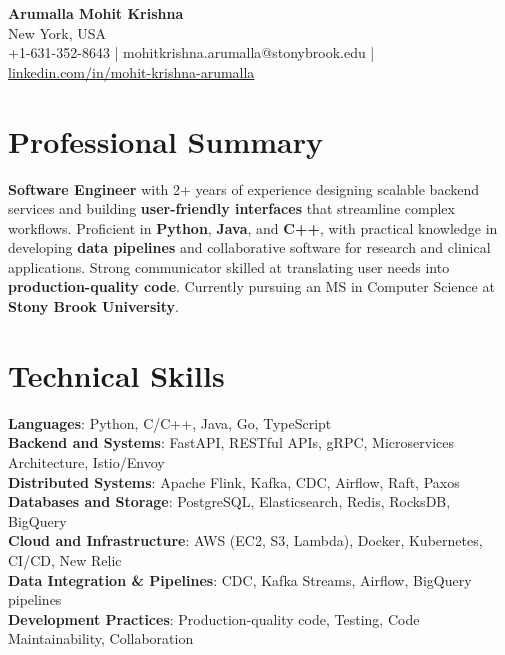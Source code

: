 \documentclass[letterpaper,11pt]{article}
\begin{document}
\begin{center}
  {\Large \textbf{Arumalla Mohit Krishna}} \\
  New York, USA \\
  +1-631-352-8643 \enspace | \enspace mohitkrishna.arumalla@stonybrook.edu \enspace | \enspace \href{https://www.linkedin.com/in/mohit-krishna-arumalla}{linkedin.com/in/mohit-krishna-arumalla}
\end{center}

\section{Professional Summary}
  \begin{itemize}[leftmargin=0.15in, label={}]
    \small{\item{
     \textbf{Software Engineer} with 2+ years of experience designing scalable backend services and building \textbf{user-friendly interfaces} that streamline complex workflows. Proficient in \textbf{Python}, \textbf{Java}, and \textbf{C++}, with practical knowledge in developing \textbf{data pipelines} and collaborative software for research and clinical applications. Strong communicator skilled at translating user needs into \textbf{production-quality code}. Currently pursuing an MS in Computer Science at \textbf{Stony Brook University}.
    }}
  \end{itemize}
\vspace{-16pt}

\section{Technical Skills}
 \begin{itemize}[leftmargin=0.15in, label={}]
    \small{\item{
     \textbf{Languages}: Python, C/C++, Java, Go, TypeScript \\
     \textbf{Backend and Systems}: FastAPI, RESTful APIs, gRPC, Microservices Architecture, Istio/Envoy \\
     \textbf{Distributed Systems}: Apache Flink, Kafka, CDC, Airflow, Raft, Paxos \\
     \textbf{Databases and Storage}: PostgreSQL, Elasticsearch, Redis, RocksDB, BigQuery \\
     \textbf{Cloud and Infrastructure}: AWS (EC2, S3, Lambda), Docker, Kubernetes, CI/CD, New Relic \\
     \textbf{Data Integration \& Pipelines}: CDC, Kafka Streams, Airflow, BigQuery pipelines \\
     \textbf{Development Practices}: Production-quality code, Testing, Code Maintainability, Collaboration
    }}
 \end{itemize}
\vspace{-16pt}
\end{document}
